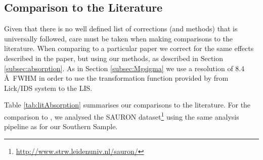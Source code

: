 \documentclass[a4paper,fleqn,usenatbib]{mnras}
\begin{document}
	\subsection{Comparison to the Literature}
		\label{subsec:Lit}
		Given that there is no well defined list of corrections (and methods) that is universally followed, care must be taken when making comparisons to the literature. When comparing to a particular paper we correct for the same effects described in the paper, but using our methods, as described in Section \ref{subsec:absorption}. As in Section \ref{subsec:Mgsigma} we use a resolution of 8.4\,\AA\ FWHM in order to use the transformation function provided by \citet{Vazdekis2010} from Lick/IDS system to the LIS.

		Table \ref{tab:litAbsorption} summarises our comparisons to the literature. For the comparison to \citet{Vazdekis2010}, we analysed the SAURON dataset\footnote{\url{http://www.strw.leidenuniv.nl/sauron/}} \citep{Emsellem2004} using the same analysis pipeline as for our Southern Sample. 
\end{document}
